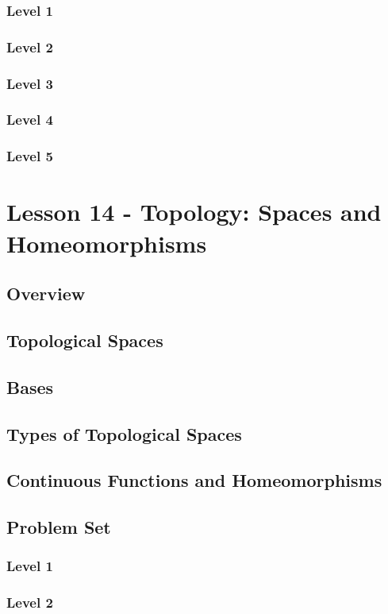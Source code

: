 \documentclass{article}
\begin{document}
\begin{theorem}
\subsubsection{Level 1}
\subsubsection{Level 2}
\subsubsection{Level 3}
\subsubsection{Level 4}
\subsubsection{Level 5}
\pagebreak

\section{Lesson 14 - Topology: Spaces and Homeomorphisms}
\subsection{Overview}
\subsection{Topological Spaces}
\subsection{Bases}
\subsection{Types of Topological Spaces}
\subsection{Continuous Functions and Homeomorphisms}
\subsection{Problem Set}
\subsubsection{Level 1}
\subsubsection{Level 2}

\end{theorem}
\end{document}
